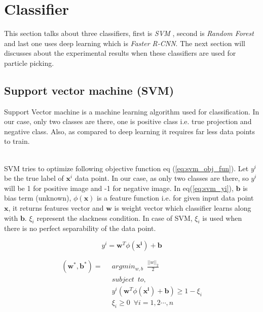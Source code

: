 \documentclass{report}
\begin{document}
\section{Classifier}
This section talks about three classifiers, first is \textit{SVM} , second is \textit{Random Forest} and last one uses deep learning which is \textit{Faster R-CNN}. The next section will discusses about the experimental results when these classifiers are used for particle picking.

\subsection{Support vector machine (SVM) }
Support Vector machine is a machine learning algorithm used for classification. In our case, only two classes are there, one is positive class i.e. true projection and negative class. Also, as compared to deep learning it requires far less data points to train. 

\noindent\\
SVM tries to optimize following objective function eq (\ref{eq:svm_obj_fun}).
Let $y^i$ be the true label of $\boldsymbol{x}^i$ data point. In our case, as only two classes are there, so $y^i$ will be 1 for positive image and -1 for negative image. In eq(\ref{eq:svm_yi}), $\boldsymbol{b}$ is bias term (unknown), $\phi(\boldsymbol{x})$ is a feature function i.e. for given input data point $\boldsymbol{x}$, it returns features vector and  $\boldsymbol{w}$ is weight vector which classifier learns along with $\boldsymbol{b}$. $\xi_i$ represent the slackness condition. In case of SVM, $\xi_i$ is used when there is no perfect separability of the data point. 

\begin{equation}\label{eq:svm_yi}
    y^i= \boldsymbol{w}^T \phi(\boldsymbol{x^i}) + \boldsymbol{b}
\end{equation}


\begin{equation}\label{eq:svm_obj_fun}
  \begin{aligned}
    \boldsymbol{(w^*,b^*)} = & \enspace argmin_{w,b} \enspace \frac{||w||_2}{2}\\  
     &\enspace  subject \enspace to,\\
     &\enspace y^i(\boldsymbol{w}^T \phi(\boldsymbol{x^i}) + \boldsymbol{b}) \geq 1-\xi_i\\
      &\enspace \xi_i \geq 0 \enspace  \forall i = 1,2 \cdots , n 
  \end{aligned}
\end{equation}
\end{document}
